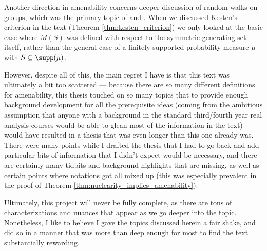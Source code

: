 Another direction in amenability concerns deeper discussion of random walks on groups, which was the primary topic of \cite{kesten_means} and \cite{kesten_random_walks}. When we discussed Kesten's criterion in the text (Theorem \ref{thm:kesten_criterion}) we only looked at the basic case where $M(S)$ was defined with respect to the symmetric generating set itself, rather than the general case of a finitely supported probability measure $\mu$ with $S\subseteq \supp(\mu)$.\newline

However, despite all of this, the main regret I have is that this text was ultimately a bit too scattered --- because there are so many different definitions for amenability, this thesis touched on so many topics that to provide enough background development for all the prerequisite ideas (coming from the ambitious assumption that anyone with a background in the standard third/fourth year real analysis courses would be able to glean most of the information in the text) would have resulted in a thesis that was even longer than this one already was. There were many points while I drafted the thesis that I had to go back and add particular bits of information that I didn't expect would be necessary, and there are certainly many tidbits and background highlights that are missing, as well as certain points where notations got all mixed up (this was especially prevalent in the proof of Theorem \ref{thm:nuclearity_implies_amenability}).\newline

Ultimately, this project will never be fully complete, as there are tons of characterizations and nuances that appear as we go deeper into the topic. Nonetheless, I like to believe I gave the topics discussed herein a fair shake, and did so in a manner that was more than deep enough for most to find the text substantially rewarding.
